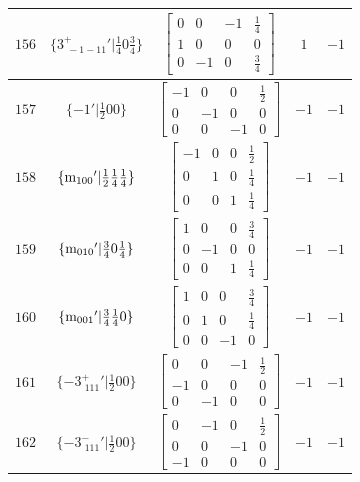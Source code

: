 \documentclass[fleqn,8pt]{jsarticle}
\begin{document}
\begin{longtable}{ccccc}
$ 156 $ & $ \{3^{+}_{\,\,-1-11}{}'|\frac{1}{4} 0 \frac{3}{4}\} $ & $ \begin{bmatrix} 0 & 0 & -1 & \frac{1}{4} \\ 1 & 0 & 0 & 0 \\ 0 & -1 & 0 & \frac{3}{4} \end{bmatrix} $ & $ 1 $ & $ -1 $ \\ \hline
$ 157 $ & $ \{-1{}'|\frac{1}{2} 0 0\} $ & $ \begin{bmatrix} -1 & 0 & 0 & \frac{1}{2} \\ 0 & -1 & 0 & 0 \\ 0 & 0 & -1 & 0 \end{bmatrix} $ & $ -1 $ & $ -1 $ \\ \hline
$ 158 $ & $ \{{\rm m}_{100}{}'|\frac{1}{2} \frac{1}{4} \frac{1}{4}\} $ & $ \begin{bmatrix} -1 & 0 & 0 & \frac{1}{2} \\ 0 & 1 & 0 & \frac{1}{4} \\ 0 & 0 & 1 & \frac{1}{4} \end{bmatrix} $ & $ -1 $ & $ -1 $ \\ \hline
$ 159 $ & $ \{{\rm m}_{010}{}'|\frac{3}{4} 0 \frac{1}{4}\} $ & $ \begin{bmatrix} 1 & 0 & 0 & \frac{3}{4} \\ 0 & -1 & 0 & 0 \\ 0 & 0 & 1 & \frac{1}{4} \end{bmatrix} $ & $ -1 $ & $ -1 $ \\ \hline
$ 160 $ & $ \{{\rm m}_{001}{}'|\frac{3}{4} \frac{1}{4} 0\} $ & $ \begin{bmatrix} 1 & 0 & 0 & \frac{3}{4} \\ 0 & 1 & 0 & \frac{1}{4} \\ 0 & 0 & -1 & 0 \end{bmatrix} $ & $ -1 $ & $ -1 $ \\ \hline
$ 161 $ & $ \{-3^{+}_{\,\,111}{}'|\frac{1}{2} 0 0\} $ & $ \begin{bmatrix} 0 & 0 & -1 & \frac{1}{2} \\ -1 & 0 & 0 & 0 \\ 0 & -1 & 0 & 0 \end{bmatrix} $ & $ -1 $ & $ -1 $ \\ \hline
$ 162 $ & $ \{-3^{-}_{\,\,111}{}'|\frac{1}{2} 0 0\} $ & $ \begin{bmatrix} 0 & -1 & 0 & \frac{1}{2} \\ 0 & 0 & -1 & 0 \\ -1 & 0 & 0 & 0 \end{bmatrix} $ & $ -1 $ & $ -1 $ \\ \hline

\end{longtable}
\end{document}
